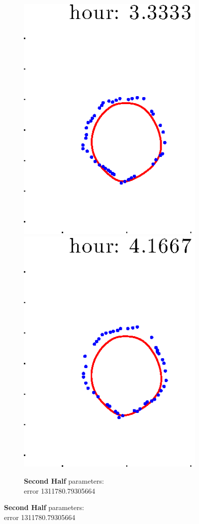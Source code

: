 \documentclass[12pt]{article}
\begin{document}
\begin{figure}[h!]
\begin{subfigure}[b]{.3\textwidth}
		\includegraphics[height=.15\textheight]{Pos14exp8/firsthalf/second5.eps}
		\includegraphics[height=.15\textheight]{Pos14exp8/firsthalf/second6.eps}
		\caption{\textbf{Second Half} parameters: \\error 1311780.79305664}
	\end{subfigure}
\end{figure}
\end{document}
